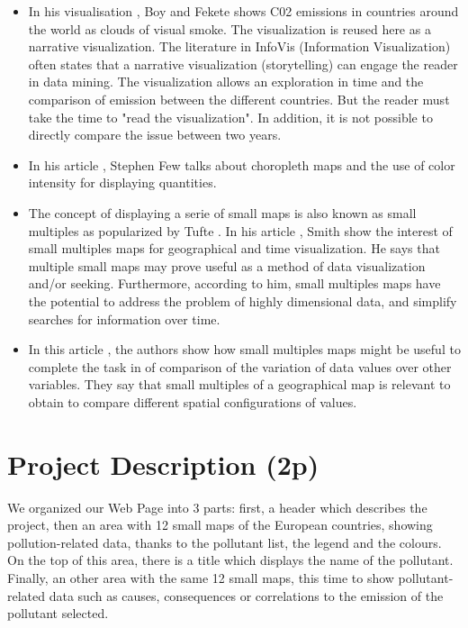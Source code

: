 \documentclass[preprint,journal]{vgtc}       %
\begin{document}
\begin{itemize}
\item In his visualisation \cite{Boy:2014:TCP}, Boy and Fekete shows C02 emissions in countries around the world as clouds of visual smoke. The visualization is reused here \cite{Mediapart:2014:CPM} as a narrative visualization. The literature in InfoVis (Information Visualization) often states that a narrative visualization (storytelling) can engage the reader in data mining. The visualization allows an exploration in time and the comparison of emission between the different countries. But the reader must take the time to "read the visualization". In addition, it is not possible to directly compare the issue between two years.

\item In his article \cite{Few:2009:GDV}, Stephen Few talks about choropleth maps and the use of color intensity for displaying quantities.

\item The concept of displaying a serie of small maps is also known as small multiples as popularized by Tufte \cite{Tufte:1983:VDQ}. In his article \cite{Smith:2005:MSM}, Smith show the interest of small multiples maps for geographical and time visualization. He says that multiple small maps may prove useful as a method of data visualization and/or seeking. Furthermore, according to him, small multiples maps have the potential to address the problem of highly dimensional data, and simplify searches for information over time.

\item In this article \cite{Reimer:2011:SSM}, the authors show how small multiples maps might be useful to complete the task in of comparison of the variation of data values over other variables. They say that small multiples of a geographical map is relevant to obtain to compare different spatial configurations of values.

\end{itemize}

\newpage



\section{Project Description (2p)}
We organized our Web Page into 3 parts:  first, a header which describes the project, then an area with 12 small maps of the European countries, showing pollution-related data, thanks to the pollutant list, the legend and the colours. On the top of this area, there is a title which displays the name of the pollutant. Finally, an other area with the same 12 small maps, this time to show pollutant-related data such as causes, consequences or correlations to the emission of the pollutant selected.
\end{document}
